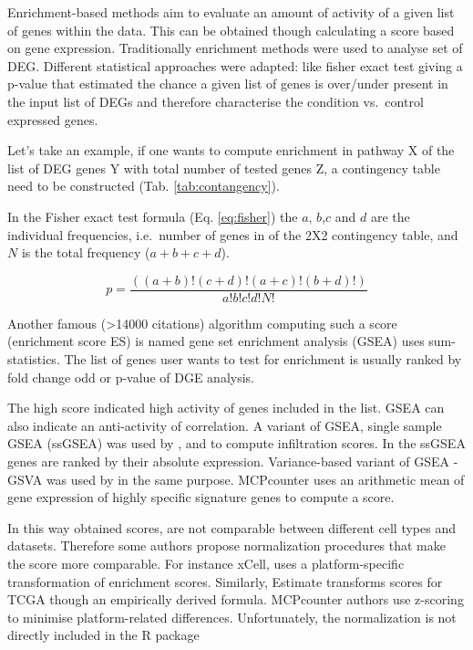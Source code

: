 \documentclass[12pt,]{book}
\theoremstyle{definition}
\theoremstyle{definition}
\theoremstyle{definition}
\theoremstyle{remark}
\begin{document}
Enrichment-based methods aim to evaluate an amount of activity of a
given list of genes within the data. This can be obtained though
calculating a score based on gene expression. Traditionally enrichment
methods were used to analyse set of DEG. Different statistical
approaches were adapted: like fisher exact test giving a p-value that
estimated the chance a given list of genes is over/under present in the
input list of DEGs and therefore characterise the condition vs.~control
expressed genes.

Let's take an example, if one wants to compute enrichment in pathway X
of the list of DEG genes Y with total number of tested genes Z, a
contingency table need to be constructed (Tab. \ref{tab:contangency}).

In the Fisher exact test formula (Eq. \eqref{eq:fisher}) the \(a\),
\(b\),\(c\) and \(d\) are the individual frequencies, i.e.~number of
genes in of the 2X2 contingency table, and \(N\) is the total frequency
(\(a + b + c + d\)).

\begin{equation} 
p= \frac{( ( a + b ) ! ( c + d ) ! ( a + c ) ! ( b + d ) ! )}{a ! b ! c ! d ! N ! } \label{eq:fisher}
\end{equation}

Another famous (\textgreater{}14000 citations) algorithm computing such
a score (enrichment score ES) is named gene set enrichment analysis
(GSEA) \citep{Subramanian2005} uses sum-statistics. The list of genes
user wants to test for enrichment is usually ranked by fold change odd
or p-value of DGE analysis.

The high score indicated high activity of genes included in the list.
GSEA can also indicate an anti-activity of correlation. A variant of
GSEA, single sample GSEA (ssGSEA) \citep{Barbie2009} was used by
\citet{Senbabaoglu2016}, \citet{Yoshihara2013} and \citet{Aran2017} to
compute infiltration scores. In the ssGSEA genes are ranked by their
absolute expression. Variance-based variant of GSEA - GSVA
\citep{Hanzelmann2013} was used by \citet{Tamborero2018} in the same
purpose. MCPcounter \citep{Becht2016} uses an arithmetic mean of gene
expression of highly specific signature genes to compute a score.

In this way obtained scores, are not comparable between different cell
types and datasets. Therefore some authors propose normalization
procedures that make the score more comparable. For instance xCell, uses
a platform-specific transformation of enrichment scores. Similarly,
Estimate transforms scores for TCGA though an empirically derived
formula. MCPcounter authors use z-scoring to minimise platform-related
differences. Unfortunately, the normalization is not directly included
in the R package
\end{document}
